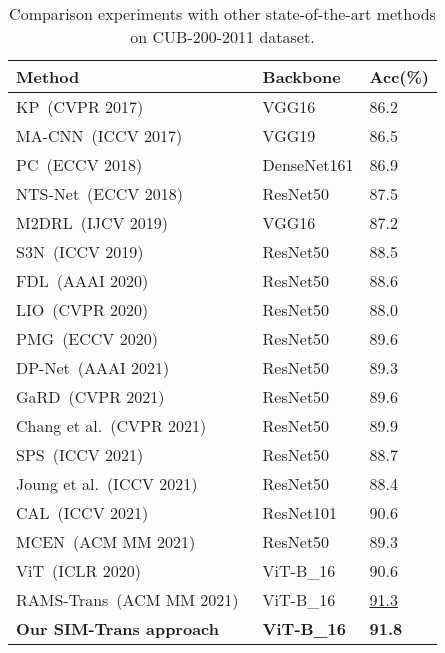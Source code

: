 \documentclass[sigconf, nonacm]{acmart}
\begin{document}
\begin{table}[!t]
 \centering
 \caption{Comparison experiments with other state-of-the-art methods on CUB-200-2011 dataset.}
 \label{table_cub_acc}
 \begin{tabularx}{\linewidth}{|p{4.3cm}|Y|Y|}
  \hline
  
  Method    & Backbone & Acc(\%)  \\ \hline

KP~(CVPR 2017)~\cite{cui2017kernel}    & VGG16 &86.2 \\
  MA-CNN~(ICCV 2017)~\cite{zheng2017learning}    & VGG19 &86.5 \\
  PC~(ECCV 2018)~\cite{dubey2018pairwise}   & DenseNet161 &86.9 \\
  NTS-Net~(ECCV 2018)~\cite{yang2018learning}    & ResNet50 &87.5 \\
  
   
  M2DRL~(IJCV 2019)~\cite{he2019and}    & VGG16 &87.2 \\
  
  
  S3N~(ICCV 2019)~\cite{ding2019selective}    & ResNet50 &88.5 \\
  FDL~(AAAI 2020)~\cite{liu2020filtration}    & ResNet50 &88.6 \\
  LIO~(CVPR 2020)~\cite{zhou2020look}    & ResNet50 &88.0 \\
  
  PMG~(ECCV 2020)~\cite{du2020fine}    & ResNet50 &89.6 \\   
  
  DP-Net~(AAAI 2021)~\cite{wang2021dynamic}  & ResNet50 &89.3 \\

  GaRD~(CVPR 2021)~\cite{zhao2021graph}    & ResNet50 &89.6 \\ 
  Chang et al.~(CVPR 2021)~\cite{chang2021your}    & ResNet50 &89.9 \\ 
  SPS~(ICCV 2021)~\cite{huang2021stochastic}    & ResNet50 &88.7 \\ 
  Joung et al.~(ICCV 2021)~\cite{joung2021learning}    & ResNet50 &88.4 \\ 
  CAL~(ICCV 2021)~\cite{rao2021counterfactual}    & ResNet101 &90.6 \\
  MCEN~(ACM MM 2021)~\cite{li2021multi}    & ResNet50 &89.3\\ 
  ViT~(ICLR 2020)~\cite{dosovitskiy2020image}    & ViT-B\_16 &90.6\\ 

  RAMS-Trans~(ACM MM 2021)~\cite{hu2021rams}    & ViT-B\_16 &\underline{91.3}\\
  \textbf{Our SIM-Trans approach}   & \textbf{ViT-B\_16} & \textbf{91.8} \\
  
  \hline
  
 \end{tabularx}
\end{table}
\end{document}
